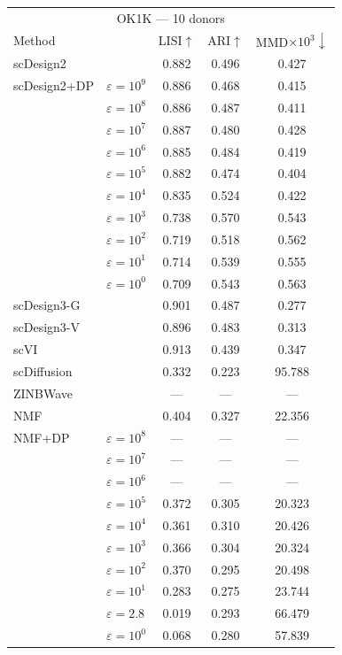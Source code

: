 \begin{tabular}{llccc}
\toprule
\multicolumn{5}{c}{OK1K — 10 donors} \\
Method & & LISI$\uparrow$ & ARI$\uparrow$ & MMD$\times 10^3\downarrow$ \\
\midrule
scDesign2 &  & 0.882 & 0.496 & 0.427 \\
scDesign2+DP & $\varepsilon=10^{9}$ & 0.886 & 0.468 & 0.415 \\
 & $\varepsilon=10^{8}$ & 0.886 & 0.487 & 0.411 \\
 & $\varepsilon=10^{7}$ & 0.887 & 0.480 & 0.428 \\
 & $\varepsilon=10^{6}$ & 0.885 & 0.484 & 0.419 \\
 & $\varepsilon=10^{5}$ & 0.882 & 0.474 & 0.404 \\
 & $\varepsilon=10^{4}$ & 0.835 & 0.524 & 0.422 \\
 & $\varepsilon=10^{3}$ & 0.738 & 0.570 & 0.543 \\
 & $\varepsilon=10^{2}$ & 0.719 & 0.518 & 0.562 \\
 & $\varepsilon=10^{1}$ & 0.714 & 0.539 & 0.555 \\
 & $\varepsilon=10^{0}$ & 0.709 & 0.543 & 0.563 \\
\addlinespace[2pt]
scDesign3-G &  & 0.901 & 0.487 & 0.277 \\
\addlinespace[2pt]
scDesign3-V &  & 0.896 & 0.483 & 0.313 \\
\addlinespace[2pt]
scVI &  & 0.913 & 0.439 & 0.347 \\
\addlinespace[2pt]
scDiffusion &  & 0.332 & 0.223 & 95.788 \\
\addlinespace[2pt]
ZINBWave &  & --- & --- & --- \\
\addlinespace[2pt]
NMF &  & 0.404 & 0.327 & 22.356 \\
\addlinespace[2pt]
NMF+DP & $\varepsilon=10^{8}$ & --- & --- & --- \\
 & $\varepsilon=10^{7}$ & --- & --- & --- \\
 & $\varepsilon=10^{6}$ & --- & --- & --- \\
 & $\varepsilon=10^{5}$ & 0.372 & 0.305 & 20.323 \\
 & $\varepsilon=10^{4}$ & 0.361 & 0.310 & 20.426 \\
 & $\varepsilon=10^{3}$ & 0.366 & 0.304 & 20.324 \\
 & $\varepsilon=10^{2}$ & 0.370 & 0.295 & 20.498 \\
 & $\varepsilon=10^{1}$ & 0.283 & 0.275 & 23.744 \\
 & $\varepsilon=2.8$ & 0.019 & 0.293 & 66.479 \\
 & $\varepsilon=10^{0}$ & 0.068 & 0.280 & 57.839 \\
\bottomrule
\end{tabular}

